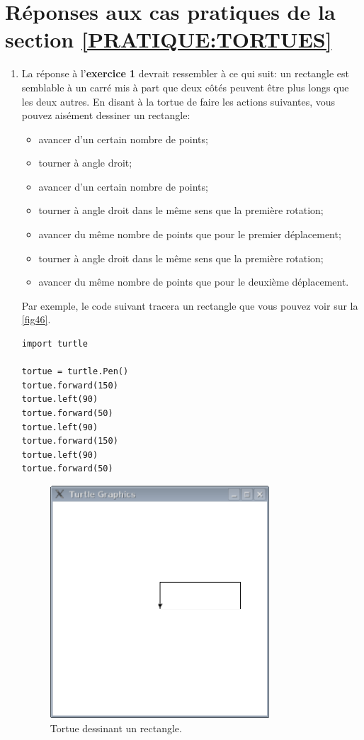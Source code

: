 \section{Réponses aux cas pratiques de la section  \ref{PRATIQUE:TORTUES}\label{REPONSES:TORTUES}}
\begin{enumerate}
\item La réponse à l'\textbf{exercice 1} devrait ressembler à ce qui suit: un rectangle est semblable à un carré mis à part que deux côtés peuvent être plus longs que les deux autres. En disant à la tortue de faire les actions suivantes, vous pouvez aisément dessiner un rectangle:
\begin{itemize}
 \item avancer d'un certain nombre de points;
 \item tourner à angle droit;
 \item avancer d'un certain nombre de points;
 \item tourner à angle droit dans le même sens que la première rotation;
 \item avancer du même nombre de points que pour le premier déplacement;
 \item tourner à angle droit dans le même sens que la première rotation;
 \item avancer du même nombre de points que pour le deuxième déplacement.
\end{itemize}

Par exemple, le code suivant tracera un rectangle que vous pouvez voir sur la \autoref{fig46}.
\begin{Verbatim}[frame=single,rulecolor=\color{mbleu}, label=à taper]
import turtle

tortue = turtle.Pen()
tortue.forward(150)
tortue.left(90)
tortue.forward(50)
tortue.left(90)
tortue.forward(150)
tortue.left(90)
tortue.forward(50)
\end{Verbatim}


\begin{figure}[!ht]
\begin{center}
\includegraphics[width=82mm]{images/rectangletortue.eps}
\end{center}
\caption{Tortue dessinant un rectangle.}\label{fig46}
\end{figure}


\end{enumerate}
